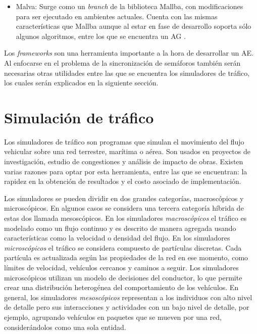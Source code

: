 \begin{itemize}
	\item Malva: Surge como un \emph{branch} de la biblioteca Mallba, con modificaciones para ser ejecutado en ambientes actuales. Cuenta con las mismas características que Mallba aunque al estar en fase de desarrollo soporta sólo algunos algoritmos, entre los que se encuentra un AG \citep{Malva}.
\end{itemize}

Los \emph{frameworks} son una herramienta importante a la hora de desarrollar un AE. Al enfocarse en el problema de la sincronización de semáforos también serán necesarias otras utilidades entre las que se encuentra los simuladores de tráfico, los cuales serán explicados en la siguiente sección.


\section{Simulación de tráfico}

Los simuladores de tráfico son programas que simulan el movimiento del flujo vehicular sobre una red terrestre, marítima o aérea. Son usados en proyectos de investigación, estudio de congestiones y análisis de impacto de obras.  Existen varias razones para optar por esta herramienta, entre las que se encuentran: la rapidez en la obtención de resultados y el costo asociado de implementación.


Los simuladores se pueden dividir en dos grandes categorías, macroscópicos y microscópicos. En algunos casos se considera una tercera categoría híbrida de estas dos llamada mesoscópicos. En los simuladores \emph{macroscópicos} el tráfico es modelado como un flujo continuo y es descrito de manera agregada usando características como la velocidad o densidad del flujo. En los simuladores \emph{microscópicos} el tráfico se considera compuesto de partículas discretas. Cada partícula es actualizada según las propiedades de la red en ese momento, como límites de velocidad, vehículos cercanos y caminos a seguir. Los simuladores microscópicos utilizan un modelo de decisiones del conductor, lo que permite crear una distribución heterogénea del comportamiento de los vehículos. En general, los simuladores \emph{mesoscópicos} representan a los individuos con alto nivel de detalle pero sus interacciones y actividades con un bajo nivel de detalle, por ejemplo, agrupando vehículos en paquetes que se mueven por una red, considerándolos como una sola entidad.



